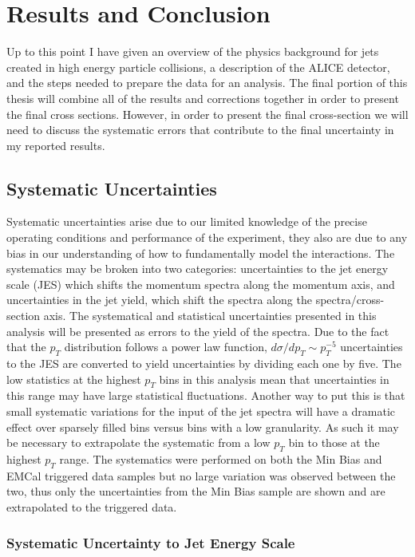 \chapter{Results and Conclusion} \label{ch:cando}

Up to this point I have given an overview of the physics background for jets created in high energy particle collisions, a description of the ALICE detector, and the steps needed to prepare the data for an analysis.  The final portion of this thesis will combine all of the results and corrections together in order to present the final cross sections.  However, in order to present the final cross-section we will need to discuss the systematic errors that contribute to the final uncertainty in my reported results.

\section{Systematic Uncertainties}

Systematic uncertainties arise due to our limited knowledge of the precise operating conditions and performance of the experiment, they also are due to any bias in our understanding of how to fundamentally model the interactions.  The systematics may be broken into two categories: uncertainties to the jet energy scale (JES) which shifts the momentum spectra along the momentum axis, and uncertainties in the jet yield, which shift the spectra along the spectra/cross-section axis.  The systematical and statistical uncertainties presented in this analysis will be presented as errors to the yield of the spectra.  Due to the fact that the $p_{T}$ distribution follows a power law function, $d\sigma/dp_{T} \sim p_{T}^{-5}$ uncertainties to the JES are converted to yield uncertainties by dividing each one by five.
The low statistics at the highest $p_{T}$ bins in this analysis mean that uncertainties in this range may have large statistical fluctuations.  Another way to put this is that small systematic variations for the input of the jet spectra will have a dramatic effect over sparsely filled bins versus bins with a low granularity.  As such it may be necessary to extrapolate the systematic from a low $p_{T}$ bin to those at the highest $p_{T}$ range.  The systematics were performed on both the Min Bias and EMCal triggered data samples but no large variation was observed between the two, thus only the uncertainties from the Min Bias sample are shown and are extrapolated to the triggered data.


\subsection{Systematic Uncertainty to Jet Energy Scale}

